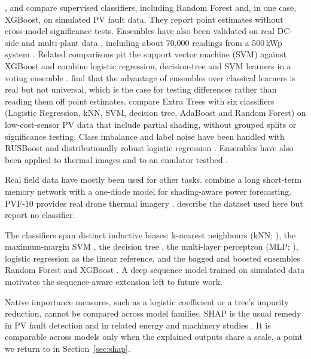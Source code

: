 \documentclass[11pt,a4paper]{article}
\begin{document}
\citet{Eldeghady2024}, \citet{Khandeparkar2025} and \citet{Mouleloued2025} compare supervised classifiers, including Random Forest and, in one case, XGBoost, on simulated PV fault data. They report point estimates without cross-model significance tests. Ensembles have also been validated on real DC-side and multi-plant data \citep{Chen2018,Dhibi2021,Harrou2022,Hussain2022}, including about 70{,}000 readings from a 500\,kWp system \citep{Gaaloul2025}. Related comparisons pit the support vector machine (SVM) against XGBoost \citep{Suliman2024} and combine logistic regression, decision-tree and SVM learners in a voting ensemble \citep{Yang2022}. \citet{Mellit2022} find that the advantage of ensembles over classical learners is real but not universal, which is the case for testing differences rather than reading them off point estimates. \citet{TocheTchio2024} compare Extra Trees with six classifiers (Logistic Regression, kNN, SVM, decision tree, AdaBoost and Random Forest) on low-cost-sensor PV data that include partial shading, without grouped splits or significance testing. Class imbalance and label noise have been handled with RUSBoost \citep{Adhya2023} and distributionally robust logistic regression \citep{Wang2023}. Ensembles have also been applied to thermal images \citep{KrishnaVeni2025} and to an emulator testbed \citep{QuilesCucarella2025}.

Real field data have mostly been used for other tasks. \citet{Kappler2024} combine a long short-term memory network with a one-diode model for shading-aware power forecasting. PVF-10 provides real drone thermal imagery \citep{Wang2024a}. \citet{Graillet2022} describe the dataset used here but report no classifier.

The classifiers span distinct inductive biases: k-nearest neighbours (kNN; \citealp{Cover1967}), the maximum-margin SVM \citep{Cortes1995}, the decision tree \citep{Quinlan1986}, the multi-layer perceptron (MLP; \citealp{Rumelhart1986}), logistic regression as the linear reference, and the bagged and boosted ensembles Random Forest \citep{Breiman2001} and XGBoost \citep{Chen2016}. A deep sequence model trained on simulated data \citep{Amiri2024} motivates the sequence-aware extension left to future work.

Native importance measures, such as a logistic coefficient or a tree's impurity reduction, cannot be compared across model families. SHAP \citep{Lundberg2017} is the usual remedy in PV fault detection \citep{Utama2023} and in related energy and machinery studies \citep{Cakiroglu2024,Santos2024,Bindingso2023}. It is comparable across models only when the explained outputs share a scale, a point we return to in Section~\ref{sec:shap}.
\end{document}
